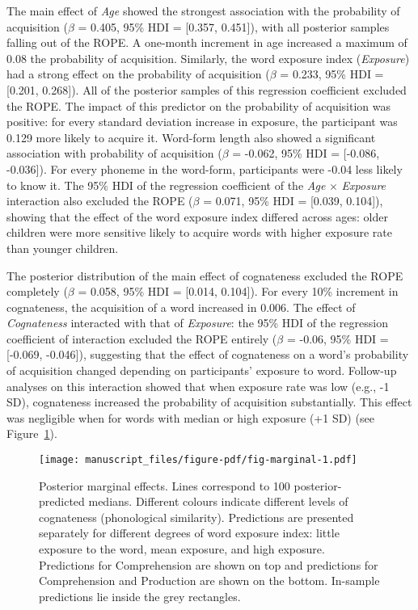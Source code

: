 \documentclass[
]{article}
\begin{document}
The main effect of \emph{Age} showed the strongest association with the
probability of acquisition (\(\beta\) = 0.405, 95\% HDI = {[}0.357,
0.451{]}), with all posterior samples falling out of the ROPE. A
one-month increment in age increased a maximum of 0.08 the probability
of acquisition. Similarly, the word exposure index (\emph{Exposure}) had
a strong effect on the probability of acquisition (\(\beta\) = 0.233,
95\% HDI = {[}0.201, 0.268{]}). All of the posterior samples of this
regression coefficient excluded the ROPE. The impact of this predictor
on the probability of acquisition was positive: for every standard
deviation increase in exposure, the participant was 0.129 more likely to
acquire it. Word-form length also showed a significant association with
probability of acquisition (\(\beta\) = -0.062, 95\% HDI = {[}-0.086,
-0.036{]}). For every phoneme in the word-form, participants were -0.04
less likely to know it. The 95\% HDI of the regression coefficient of
the \emph{Age} \(\times\) \emph{Exposure} interaction also excluded the
ROPE (\(\beta\) = 0.071, 95\% HDI = {[}0.039, 0.104{]}), showing that
the effect of the word exposure index differed across ages: older
children were more sensitive likely to acquire words with higher
exposure rate than younger children.

The posterior distribution of the main effect of cognateness excluded
the ROPE completely (\(\beta\) = 0.058, 95\% HDI = {[}0.014, 0.104{]}).
For every 10\% increment in cognateness, the acquisition of a word
increased in 0.006. The effect of \emph{Cognateness} interacted with
that of \emph{Exposure}: the 95\% HDI of the regression coefficient of
interaction excluded the ROPE entirely (\(\beta\) = -0.06, 95\% HDI =
{[}-0.069, -0.046{]}), suggesting that the effect of cognateness on a
word's probability of acquisition changed depending on participants'
exposure to word. Follow-up analyses on this interaction showed that
when exposure rate was low (e.g., -1 SD), cognateness increased the
probability of acquisition substantially. This effect was negligible
when for words with median or high exposure (+1 SD) (see
Figure~\ref{fig-marginal}).

\begin{figure}

{\centering \texttt{[image: manuscript\_files/figure-pdf/fig-marginal-1.pdf]}

}

\caption{\label{fig-marginal}Posterior marginal effects. Lines
correspond to 100 posterior-predicted medians. Different colours
indicate different levels of cognateness (phonological similarity).
Predictions are presented separately for different degrees of word
exposure index: little exposure to the word, mean exposure, and high
exposure. Predictions for Comprehension are shown on top and predictions
for Comprehension and Production are shown on the bottom. In-sample
predictions lie inside the grey rectangles.}

\end{figure}
\end{document}
